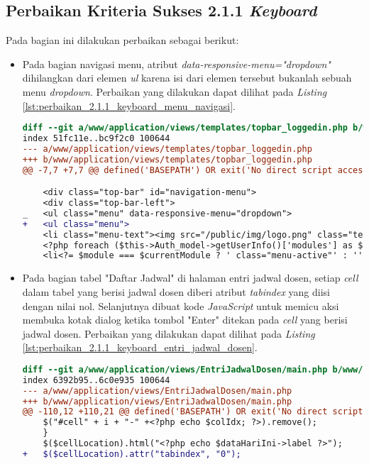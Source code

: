 \subsection{Perbaikan Kriteria Sukses 2.1.1 \textit{Keyboard}}
\label{subsec:perbaikan_kriteria_sukses_2.1.1}
Pada bagian ini dilakukan perbaikan sebagai berikut:

\begin{itemize}
\item Pada bagian navigasi menu, atribut \textit{data-responsive-menu="dropdown"} dihilangkan dari elemen \textit{ul} karena isi dari elemen tersebut bukanlah sebuah menu \textit{dropdown}. Perbaikan yang dilakukan dapat dilihat pada \textit{Listing} \ref{lst:perbaikan_2.1.1_keyboard_menu_navigasi}.
\begin{lstlisting}[frame=single, label={lst:perbaikan_2.1.1_keyboard_menu_navigasi}, language=diff, caption=Perbaikan Kriteria Sukses 2.1.1 pada Menu Navigasi]
diff --git a/www/application/views/templates/topbar_loggedin.php b/www/application/views/templates/topbar_loggedin.php
index 51fc11e..bc9f2c0 100644
--- a/www/application/views/templates/topbar_loggedin.php
+++ b/www/application/views/templates/topbar_loggedin.php
@@ -7,7 +7,7 @@ defined('BASEPATH') OR exit('No direct script access allowed');

    <div class="top-bar" id="navigation-menu">
    <div class="top-bar-left">
_   <ul class="menu" data-responsive-menu="dropdown">
+   <ul class="menu">
    <li class="menu-text"><img src="/public/img/logo.png" class="textsized" alt="B"/></li>
    <?php foreach ($this->Auth_model->getUserInfo()['modules'] as $module): ?>
    <li<?= $module === $currentModule ? ' class="menu-active"' : '' ?>><a href="/<?= $module ?>"><?= $this->config->item('module-names')[$module] ?></a></li>
\end{lstlisting}

\item Pada bagian tabel "Daftar Jadwal" di halaman entri jadwal dosen, setiap \textit{cell} dalam tabel yang berisi jadwal dosen diberi atribut \textit{tabindex} yang diisi dengan nilai nol. Selanjutnya dibuat kode \textit{JavaScript} untuk memicu aksi membuka kotak dialog ketika tombol "Enter" ditekan pada \textit{cell} yang berisi jadwal dosen. Perbaikan yang dilakukan dapat dilihat pada \textit{Listing} \ref{lst:perbaikan_2.1.1_keyboard_entri_jadwal_dosen}.
\begin{lstlisting}[frame=single, label={lst:perbaikan_2.1.1_keyboard_entri_jadwal_dosen}, language=diff, caption=Perbaikan Kriteria Sukses 2.1.1 pada Halaman Entri Jadwal Dosen]
diff --git a/www/application/views/EntriJadwalDosen/main.php b/www/application/views/EntriJadwalDosen/main.php
index 6392b95..6c0e935 100644
--- a/www/application/views/EntriJadwalDosen/main.php
+++ b/www/application/views/EntriJadwalDosen/main.php
@@ -110,12 +110,21 @@ defined('BASEPATH') OR exit('No direct script access allowed');
    $("#cell" + i + "-" +<?php echo $colIdx; ?>).remove();
    }
    $($cellLocation).html("<?php echo $dataHariIni->label ?>");
+   $($cellLocation).attr("tabindex", "0");


\end{lstlisting}
\end{itemize}

